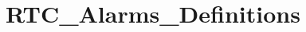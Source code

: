 \hypertarget{group___r_t_c___alarms___definitions}{\section{R\-T\-C\-\_\-\-Alarms\-\_\-\-Definitions}
\label{group___r_t_c___alarms___definitions}
}
